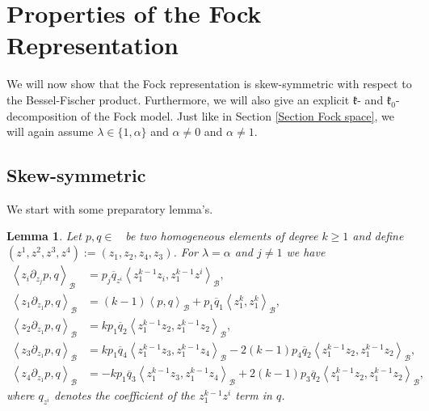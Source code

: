 \documentclass{amsart}
\newtheorem{lemma}[theorem]{Lemma}
\numberwithin{theorem}{section}
\theoremstyle{definition}
\theoremstyle{remark}
\DeclareMathOperator{\Fock}{\mc F_\lambda}
\newcommand{\bfip}[1]{\left<{#1}\right>_\mathcal B}
\newcommand{\pt}[1]{\partial_{#1}}
\newcommand{\mf}[1]{\mathfrak{#1}}
\newcommand{\mc}[1]{\mathcal{#1}}
\newcommand{\ol}[1]{\overline{#1}}
\begin{document}
\section{Properties of the Fock Representation}
We will now show that the Fock representation is skew-symmetric with respect to the Bessel-Fischer product. Furthermore, we will also give an explicit $\mf{k}$- and $\mf{k}_0$-decomposition of the Fock model. Just like in Section \ref{Section Fock space}, we will again assume $\lambda \in \{1,\alpha\}$ and $\alpha\not=0$ and $\alpha\not=1$.

\subsection{Skew-symmetric}
We start with some preparatory lemma's. 
\begin{lemma}\label{LemEulerish}
Let $p,q\in \Fock$ be two homogeneous elements of degree $k\geq 1$ and define $(z^1, z^2, z^3, z^4) := (z_1, z_2, z_4, z_3) $. For $\lambda=\alpha$ and $j\neq 1$ we have
\begin{align*}
\bfip{z_i \pt {z_j} p, q} &= p_j\overline{q}_{z^i}\bfip{z_1^{k-1}z_i,z_1^{k-1}z^i},\\
\bfip{{z_1} \pt {{z_1}} p, q} &= (k-1)\bfip{p,q}+p_1\overline{q}_{1}\bfip{z_1^k,z_1^k}, \\
\bfip{{z_2} \pt {{z_1}} p, q} &= kp_1\ol q_2\bfip{z_1^{k-1}{z_2}, z_1^{k-1}{z_2}}, \\
\bfip{z_3 \pt {{z_1}} p, q} &=k p_1\ol q_4\bfip{z_1^{k-1}z_3, z_1^{k-1}{z_4}}-2(k-1)p_4\ol q_2\bfip{z_1^{k-1}{z_2}, z_1^{k-1}{z_2}}, \\
\bfip{{z_4} \pt {{z_1}} p, q} &=-k p_1\ol q_3\bfip{z_1^{k-1}z_3, z_1^{k-1}{z_4}}+2(k-1)p_3\ol q_2\bfip{z_1^{k-1}{z_2}, z_1^{k-1}{z_2}},
\end{align*}
where $q_{z^i}$ denotes the coefficient of the $z_1^{k-1}z^i$ term in $q$.
\end{lemma}
\end{document}
